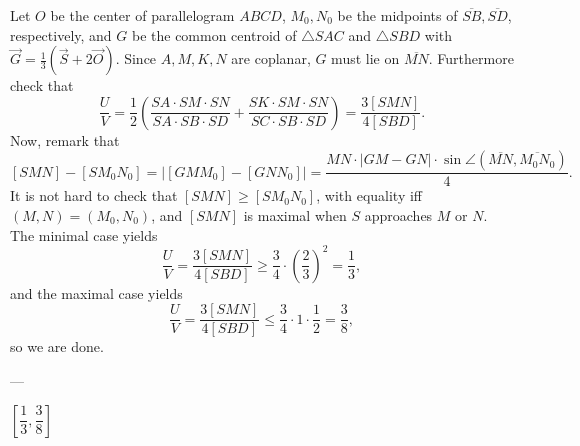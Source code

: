 Let $O$ be the center of parallelogram $ABCD$, $M_0,N_0$ be the midpoints of $\overline{SB},\overline{SD}$, respectively, and $G$ be the common centroid of $\triangle SAC$ and $\triangle SBD$ with $\vec G=\tfrac13\left(\vec S+2\vec O\right)$. Since $A,M,K,N$ are coplanar, $G$ must lie on $\overline{MN}$. Furthermore check that \[\frac UV=\frac12\left(\frac{SA\cdot SM\cdot SN}{SA\cdot SB\cdot SD}+\frac{SK\cdot SM\cdot SN}{SC\cdot SB\cdot SD}\right)=\frac{3[SMN]}{4[SBD]}.\]
Now, remark that \[[SMN]-[SM_0N_0]=\Big|[GMM_0]-[GNN_0]\Big|=\frac{MN\cdot |GM-GN|\cdot\sin\angle(\overline{MN},\overline{M_0N_0})}4.\]
It is not hard to check that $[SMN]\ge [SM_0N_0]$, with equality iff $(M,N)=(M_0,N_0)$, and $[SMN]$ is maximal when $S$ approaches $M$ or $N$. The minimal case yields \[\frac UV=\frac{3[SMN]}{4[SBD]}\ge\frac34\cdot\left(\frac23\right)^2=\frac13,\]
and the maximal case yields\[\frac UV=\frac{3[SMN]}{4[SBD]}\le\frac34\cdot 1\cdot\frac12=\frac38,\]
so we are done.

---

$\left[\dfrac13,\dfrac38\right]$
